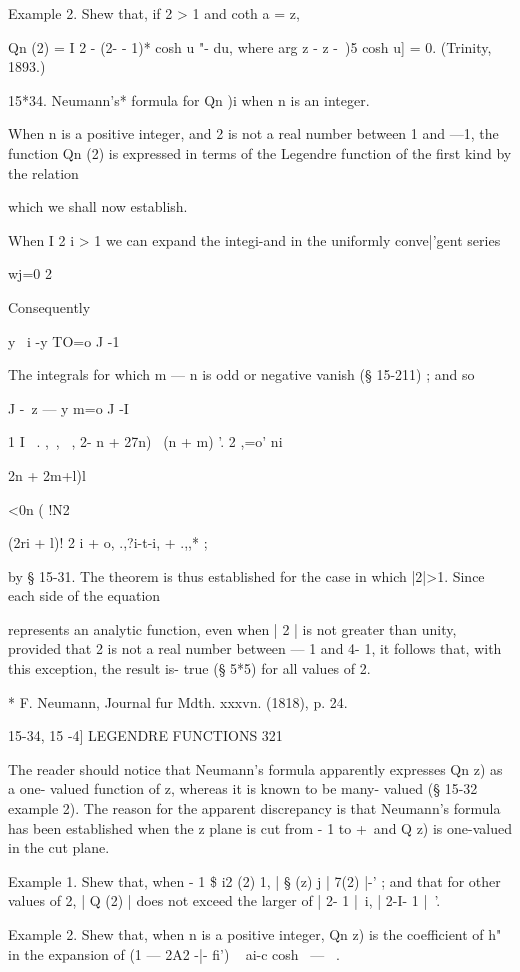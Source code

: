 {{Example 2. Shew that, if 2 > 1 and coth a = z,

Qn (2) = I 2 - (2- - 1)* cosh u "- du, where arg z - z -\ )5 cosh u] =
0. (Trinity, 1893.)

15*34. Neumann's* formula for Qn )i when n is an integer.

When n is a positive integer, and 2 is not a real number between 1 and
—1, the function Qn (2) is expressed in terms of the Legendre function
of the first kind by the relation

which we shall now establish.

When I 2 i > 1 we can expand the integi-and in the uniformly
conve|'gent series

wj=0 2

Consequently

 y \ i -y TO=o J -1

The integrals for which m — n is odd or negative vanish (§ 15-211) ;
and so

  J -\ z — y m=o J -I

 1 I \ . ,\ , \ , 2- n + 27n) \ (n + m) '. 2 ,=o' ni\ \ {2n + 2m+l)l

<0n ( !N2

(2ri + l)! 2 i + o, .,?i-t-i, + .,,* ;

by § 15-31. The theorem is thus established for the case in which
|2|>1. Since each side of the equation

represents an analytic function, even when | 2 | is not greater than
unity, provided that 2 is not a real number between — 1 and 4- 1, it
follows that, with this exception, the result is- true (§ 5*5) for all
values of 2.

* F. Neumann, Journal fur Mdth. xxxvn. (1818), p. 24.

15-34, 15 -4] LEGENDRE FUNCTIONS 321

The reader should notice that Neumann's formula apparently expresses
Qn z) as a one- valued function of z, whereas it is known to be many-
valued (§ 15-32 example 2). The reason for the apparent discrepancy is
that Neumann's formula has been established when the z plane is cut
from - 1 to +\, and Q z) is one-valued in the cut plane.

Example 1. Shew that, when - 1 \$ i2 (2) 1, | § (z) j | 7(2) |-' ; and
that for other values of 2, | Q (2) | does not exceed the larger of |
2- 1 |~i, | 2-I- 1 |~'.

Example 2. Shew that, when n is a positive integer, Qn z) is the
coefficient of h" in the expansion of (1 — 2A2 -|- fi') ~ ai-c cosh \
— \ .

}}}
